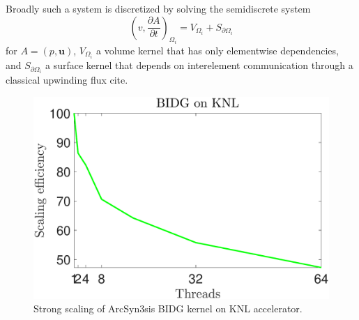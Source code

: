 Broadly such a system is discretized by solving the semidiscrete system \[ \left( v, \frac{ \partial A}{\partial t} \right)_{\Omega_{i}}= V_{\Omega_{i}}+S_{\partial\Omega_{i}} \] for $A = (p,\boldsymbol{u})$, $V_{\Omega_{i}}$ a volume kernel that has only elementwise dependencies, and $S_{\partial\Omega_{i}}$ a surface kernel that depends on interelement communication through a classical upwinding flux cite.  


\begin{figure}[h]
\begin{center}
\includegraphics[width=0.9\linewidth]{./bidg_data/scaling}
\end{center}
\vspace*{-.5cm}
\caption{Strong scaling of ArcSyn3sis BIDG kernel on KNL accelerator.}
\label{fig:dns_scaling}
\end{figure}

%
%






